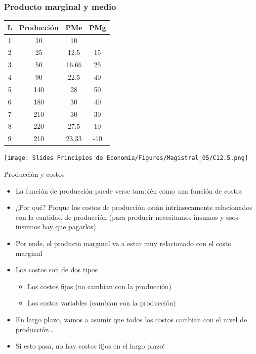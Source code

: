 \documentclass{beamer}
\begin{document}
\begin{frame}
\frametitle{Producto marginal y medio}
\begin{table}[h]
    \centering
    \begin{minipage}{0.45\textwidth}
    \renewcommand{\arraystretch}{1.3}
    \small
    \begin{tabular}{cccc}
        \hline
        \textbf{L} & \textbf{Producción} & \textbf{PMe} & \textbf{PMg} \\
        \hline
        1 & 10  & 10    &    \\
        2 & 25  & 12.5  & 15 \\
        3 & 50  & 16.66 & 25 \\
        4 & 90  & 22.5  & 40 \\
        5 & 140 & 28    & 50 \\
        6 & 180 & 30    & 40 \\
        7 & 210 & 30    & 30 \\
        8 & 220 & 27.5  & 10 \\
        9 & 210 & 23.33 & -10 \\
        \hline
    \end{tabular}
    \end{minipage}
    \begin{minipage}{0.45\textwidth}
        \centering
        \vspace{11mm}
        \texttt{[image: Slides Principios de Economia/Figures/Magistral\_05/C12.5.png]} 
    \end{minipage}
\end{table}
\end{frame}

\begin{frame}{Producción y costos}
\begin{itemize}
    \item La función de producción puede verse también como una función de costos
    \item ¿Por qué? Porque los costos de producción están intrínsecamente relacionados con la cantidad de producción (para producir necesitamos insumos y esos insumos hay que pagarlos)
    \item Por ende, el producto marginal va a estar muy relacionado con el costo marginal
    \item Los costos son de dos tipos
    \begin{itemize} 
        \item Los costos fijos (no cambian con la producción)
        \item Los costos variables (cambian con la producción)
    \end{itemize}
    \item En largo plazo, vamos a asumir que todos los costos cambian con el nivel de producción\dots
    \item Si esto pasa, no hay costos fijos en el largo plazo!
\end{itemize}
\end{frame}
\end{document}
